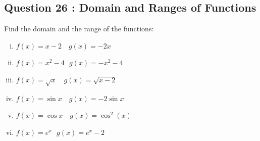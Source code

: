 \documentclass[]{article}
\begin{document}
\newpage



		\subsection*{Question 26 : Domain and Ranges of Functions}
			Find the domain and the range of the functions:
			\begin{multicols}{2}
	\begin{enumerate}[(i)]
\item $f( x )= x - 2$ \,\, $g( x )= -2 x$

\item $f( x )= x^2 - 4$\,\, $g( x )= - x^2 - 4$



\item $f( x )= \sqrt{x}$ \,\, $g( x )= \sqrt{x - 2}$



\item $f( x ) =  \sin x$ \,\, $g( x ) =  -2 \sin x$

\item $f( x ) =  \cos x$ \,\, $g( x ) =  \cos^2(x)$

\item $f( x ) =  e^{x}$\,\, $g( x) =  e^{x}- 2$


%
%
%
%
%

\end{enumerate}
\end{multicols}		\smallskip
\end{document}
